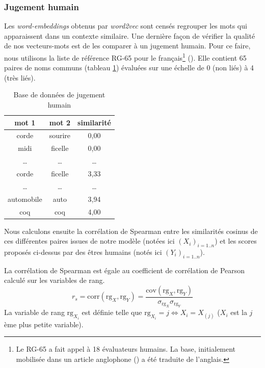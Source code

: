 \documentclass[11pt,french,french]{article}
\let\rmarkdownfootnote\footnote%
\def\footnote{\protect\rmarkdownfootnote}
\begin{document}
\hypertarget{sec:jugementHumain}{%
\subsubsection{Jugement humain}\label{sec:jugementHumain}}

Les \emph{word-embeddings} obtenus par \emph{word2vec} sont censés regrouper les mots qui apparaissent dans un contexte similaire.
Une dernière façon de vérifier la qualité de nos vecteurs-mots est de les comparer à un jugement humain. Pour ce faire, nous utilisons la liste de référence RG-65 pour le français\footnote{Le RG-65 a fait appel à 18 évaluateurs humains. La base, initialement mobilisée dans un article anglophone (\cite{Rubenstein}) a été traduite de l'anglais.} (\cite{Boumedyen}).
Elle contient 65 paires de noms communs (tableau \ref{table:human_judgement}) évaluées sur une échelle de 0 (non liés) à 4 (très liés).

\begin{table}
\begin{center}
\begin{tabular}{|c|c|c|}
    \hline
    mot 1 & mot 2 & similarité  \tabularnewline
    \hline
    corde & sourire & 0,00   \tabularnewline
    midi & ficelle & 0,00   \tabularnewline
    \dots & \dots & \dots   \tabularnewline
    corde & ficelle & 3,33   \tabularnewline
    \dots & \dots & \dots   \tabularnewline
    automobile & auto & 3,94   \tabularnewline
    coq & coq & 4,00   \tabularnewline
    \hline
 \end{tabular}
\captionsetup{margin=0cm,format=hang,justification=justified}
\caption{Base de données de jugement humain}\label{table:human_judgement}
\end{center}
\end{table}

Nous calculons ensuite la corrélation de Spearman entre les similarités cosinus de ces différentes paires issues de notre modèle (notées ici \((X_i)_{i=1..n}\)) et les scores proposés ci-dessus par des êtres humains (notés ici \((Y_i)_{i=1..n}\)).

La corrélation de Spearman est égale au coefficient de corrélation de Pearson calculé sur les variables de rang.
\[
r_s = \mathrm{corr}(\mathrm{rg}_X, \mathrm{rg}_Y) = 
\frac{\mathrm{cov}(\mathrm{rg}_X, \mathrm{rg}_Y)}{
\sigma_{\mathrm{rg}_X} \sigma_{\mathrm{rg}_Y}
}
\]
La variable de rang \(\mathrm{rg}_{X_i}\) est définie telle que \(\mathrm{rg}_{X_i}=j \iff X_i = X_{(j)}\) (\(X_i\) est la \(j\)ème plus petite variable).
\end{document}
